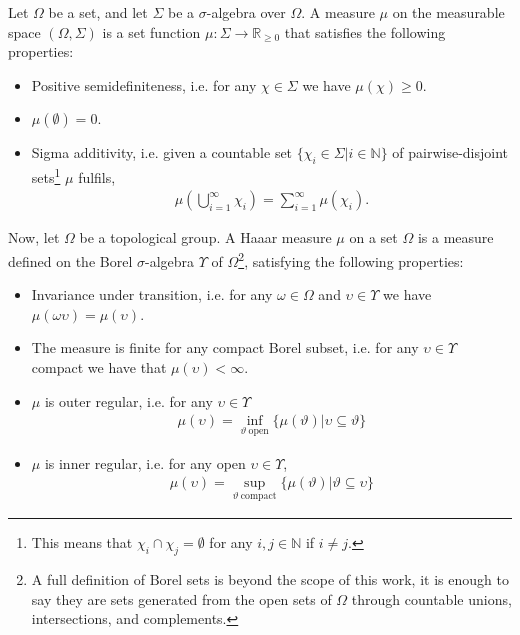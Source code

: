 \documentclass[12pt,letterpaper]{article}
\begin{document}
Let \( \Omega \) be a set, and let \( \Sigma \) be a \( \sigma \)-algebra over \( \Omega \). A measure \( \mu \) on the measurable space \( (\Omega, \Sigma) \) is a set function \( \mu : \Sigma \to \mathbb{R}_{\geq 0} \) that satisfies the following properties:
\begin{itemize}
	\item Positive semidefiniteness, i.e. for any $\chi\in\Sigma$ we have $\mu(\chi)\geq 0$.
	\item $\mu(\emptyset)=0$.
	\item Sigma additivity, i.e. given a countable set $\{\chi_i\in\Sigma|i\in\mathbb{N}\}$ of pairwise-disjoint sets\footnote{This means that $\chi_i\cap\chi_j=\emptyset$ for any $i,j\in\mathbb{N}$ if $i\neq j$.} $\mu$ fulfils, 
	\begin{align*}
		\mu\left(\bigcup_{i=1}^\infty \chi_i\right)=\sum_{i=1}^\infty \mu(\chi_i).
	\end{align*}
\end{itemize}

Now, let \( \Omega \) be a topological group. A Haaar measure \( \mu \) on a set \( \Omega \) is a measure defined on the Borel \( \sigma \)-algebra \( \Upsilon \) of \( \Omega \)\footnote{A full definition of Borel sets is beyond the scope of this work, it is enough to say they are sets generated from the open sets of \( \Omega \) through countable unions, intersections, and complements.}, satisfying the following properties:
\begin{itemize}
	\item Invariance under transition, i.e. for any $\omega \in \Omega$ and $\upsilon \in \Upsilon$ we have $\mu(\omega\upsilon)=\mu(\upsilon)$.
	\item The measure is finite for any compact Borel subset, i.e. for any $\upsilon\in\Upsilon$ compact we have that $\mu(\upsilon)<\infty$.
	\item $\mu$ is outer regular, i.e. for any $\upsilon\in\Upsilon$
		\begin{align*}
			\mu(\upsilon)=\inf_{\vartheta\:\text{open}}\{\mu(\vartheta)|\upsilon\subseteq\vartheta\}
		\end{align*}
	\item $\mu$ is inner regular, i.e. for any open $\upsilon\in\Upsilon$,
		\begin{align*}
			\mu(\upsilon)=\sup_{\vartheta\:\text{compact}}\{\mu(\vartheta)|\vartheta\subseteq\upsilon\}
		\end{align*}
\end{itemize}
\end{document}
